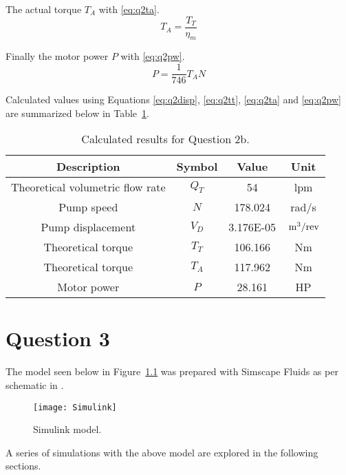 The actual torque $T_A$ with \ref{eq:q2ta}.
\begin{equation}
	\label{eq:q2ta}
	T_A = \frac{T_T}{\eta_m}
\end{equation}

Finally the motor power $P$ with \ref{eq:q2pw}.
\begin{equation}
	\label{eq:q2pw}
	P = \frac{1}{746} T_A N
\end{equation}

Calculated values using Equations \ref{eq:q2disp}, \ref{eq:q2tt}, \ref{eq:q2ta} and \ref{eq:q2pw} are summarized below in Table~\ref{tab:q2b}.

\begin{table}[H]
  \centering
  \caption{Calculated results for Question 2b.}
    \begin{tabular}{cccc}
    \toprule
    \textbf{Description} & \textbf{Symbol} & \textbf{Value } & \textbf{Unit} \\
    \midrule
    Theoretical volumetric flow rate & $Q_T$ & 54    & lpm \\
    Pump speed & $N$   & 178.024 & rad/s \\
    Pump displacement & $V_D$ & 3.176E-05 &$\,\mathrm{m^3/rev}$\\
    Theoretical  torque & $T_T$ & 106.166 & Nm \\
    Theoretical  torque & $T_A$ & 117.962 & Nm \\
    Motor power & $P$   & 28.161 & HP \\
    \bottomrule
    \end{tabular}
  \label{tab:q2b}
\end{table}


\chapter{Question 3}
\label{chap:q3}

The model seen below in Figure~\ref{fig:simulink} was prepared with Simscape Fluids \cite{simulink} as per schematic in \cite{assign}.

\begin{figure}[H]
	\centering
	\texttt{[image: Simulink]}
	\caption{Simulink model.}
	\label{fig:simulink}
\end{figure}

A series of simulations with the above model are explored in the following sections.



